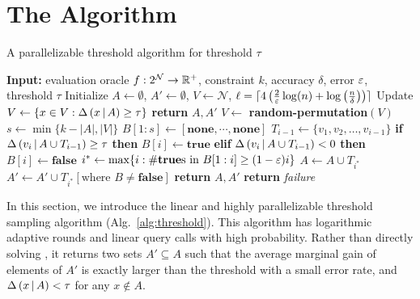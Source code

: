 \section{The \threseq Algorithm} \label{sec:ts}
\begin{algorithm}[t]
	\caption{A parallelizable threshold algorithm for threshold $\tau$}
	\label{alg:threshold}
	\begin{algorithmic}[1]
	\State \textbf{Input:} evaluation oracle $f:2^{\mathcal N} \to \mathbb{R}^+$, constraint $k$, accuracy $\delta$, error $\varepsilon$, threshold $\tau$
	\State Initialize $A \gets \emptyset$, $A' \gets \emptyset$, $V \gets \mathcal N$, 
	$\ell = \lceil 4\left(\frac{2}{\varepsilon}\log(n)+\log\left(\frac{n}{\delta}\right)\right) \rceil$ 
	  
		\State Update $V \gets \{ x \in V : \Delta \left( x \, | \, A \right) \ge \tau \}$ \label{line:threshold-filtering} 
			\State \textbf{return} $A,A'$
		\EndIf
		\State $V \gets$ \textbf{random-permutation}$(V)$ \label{line:threshold-permute}
		\State $s \gets \min \{k-|A|, |V|\}$
		\State $B[1:s] \gets [\textbf{none},\cdots,\textbf{none}]$
		 
			\State $T_{i-1} \gets \{v_1, v_2, \ldots, v_{i-1}\}$ 
			\State \textbf{if} $ \Delta \left( v_i \, | \, A\cup T_{i-1} \right) \geq  \tau $
				\textbf{then} $B[i] \gets \textbf{true}$ \label{line:threshold-if}
			\State \textbf{elif} $ \Delta \left( v_i \, | \, A\cup T_{i-1} \right) <  0$
				\textbf{then} $B[i] \gets \textbf{false}$
		\EndFor
		\State $i^* \gets \max\{i:\# \text{\textbf{true}s in } B[1:i] \ge (1-\varepsilon)i\}$  \label{line:threshold-select_of_istar}
		\State $A \gets A \cup T_{i^*}$ 
		\State $A' \gets A' \cup T_{i^*}[\text{where } B \not = \textbf{false}]$ \label{line:threshold-Aprime} 
			\State \textbf{return} $A,A'$ 
		\EndIf
	\EndFor
	\State \textbf{return} \textit{failure}
	\EndProcedure
\end{algorithmic}
\end{algorithm}
In this section, we introduce the linear and highly parallelizable
threshold sampling algorithm
\threseq (Alg.~\ref{alg:threshold}).
This algorithm has logarithmic adaptive rounds and linear query calls
with high probability.
Rather than directly solving \tp, 
it returns two sets $A' \subseteq A$ such
that the average marginal gain of elements of $A'$
is exactly larger than the threshold with a small error rate,
and $\Delta \left( x \, | \, A \right) < \tau$ for any $x \not \in A$. 

